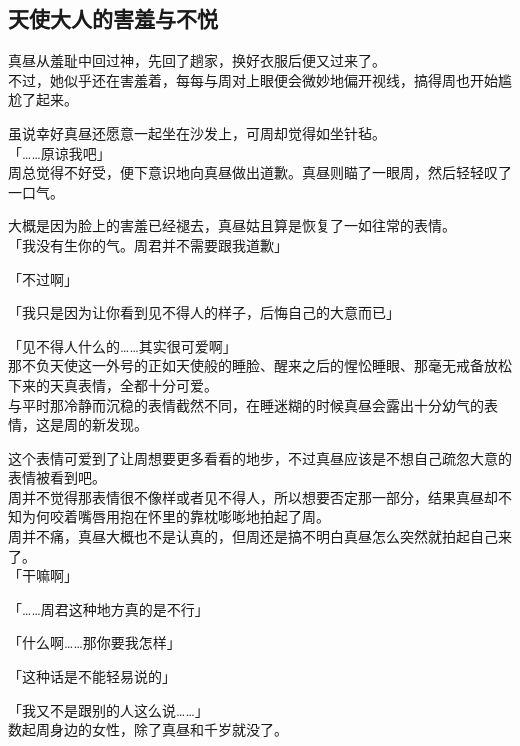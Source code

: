 \subsection{天使大人的害羞与不悦}

真昼从羞耻中回过神，先回了趟家，换好衣服后便又过来了。\\

不过，她似乎还在害羞着，每每与周对上眼便会微妙地偏开视线，搞得周也开始尴尬了起来。

虽说幸好真昼还愿意一起坐在沙发上，可周却觉得如坐针毡。\\

「……原谅我吧」\\

周总觉得不好受，便下意识地向真昼做出道歉。真昼则瞄了一眼周，然后轻轻叹了一口气。

大概是因为脸上的害羞已经褪去，真昼姑且算是恢复了一如往常的表情。\\

「我没有生你的气。周君并不需要跟我道歉」

「不过啊」

「我只是因为让你看到见不得人的样子，后悔自己的大意而已」

「见不得人什么的……其实很可爱啊」\\

那不负天使这一外号的正如天使般的睡脸、醒来之后的惺忪睡眼、那毫无戒备放松下来的天真表情，全都十分可爱。\\

与平时那冷静而沉稳的表情截然不同，在睡迷糊的时候真昼会露出十分幼气的表情，这是周的新发现。

这个表情可爱到了让周想要更多看看的地步，不过真昼应该是不想自己疏忽大意的表情被看到吧。\\

周并不觉得那表情很不像样或者见不得人，所以想要否定那一部分，结果真昼却不知为何咬着嘴唇用抱在怀里的靠枕嘭嘭地拍起了周。\\

周并不痛，真昼大概也不是认真的，但周还是搞不明白真昼怎么突然就拍起自己来了。\\

「干嘛啊」

「……周君这种地方真的是不行」

「什么啊……那你要我怎样」

「这种话是不能轻易说的」

「我又不是跟别的人这么说……」\\

数起周身边的女性，除了真昼和千岁就没了。

